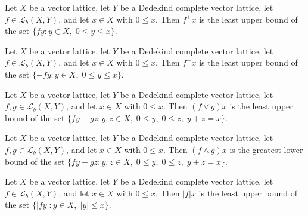 \begin{theorem}
\label{thm:isLUB-posPart-apply}
\leanok
{}
Let $X$ be a vector lattice, let $Y$ be a Dedekind complete vector
lattice, let $f \in \mathcal{L}_b(X, Y)$, and let $x \in X$ with
$0 \le x$. Then $f^{+} x$ is the least upper bound of the set
$\{ f y : y \in X, \; 0 \le y \le x \}$.
\end{theorem}

\begin{theorem}
\label{thm:isLUB-negPart-apply}
\leanok
{}
Let $X$ be a vector lattice, let $Y$ be a Dedekind complete vector
lattice, let $f \in \mathcal{L}_b(X, Y)$, and let $x \in X$ with
$0 \le x$. Then $f^{-} x$ is the least upper bound of the set
$\{ -f y : y \in X, \; 0 \le y \le x \}$.
\end{theorem}

\begin{theorem}
\label{thm:isLUB-sup-apply}
\leanok
{}
Let $X$ be a vector lattice, let $Y$ be a Dedekind complete vector
lattice, let $f, g \in \mathcal{L}_b(X, Y)$, and let $x \in X$ with
$0 \le x$. Then $(f \vee g) x$ is the least upper bound of the set
$\{ f y + g z : y, z \in X, \; 0 \le y, \; 0 \le z, \; y + z = x \}$.
\end{theorem}

\begin{theorem}
\label{thm:isGLB-inf-apply}
\leanok
{}
Let $X$ be a vector lattice, let $Y$ be a Dedekind complete vector
lattice, let $f, g \in \mathcal{L}_b(X, Y)$, and let $x \in X$ with
$0 \le x$. Then $(f \wedge g) x$ is the greatest lower bound of the
set $\{ f y + g z : y, z \in X, \; 0 \le y, \; 0 \le z, \; y + z =
x \}$.
\end{theorem}

\begin{theorem}
\label{thm:isLUB-abs-apply}
\leanok
{}
Let $X$ be a vector lattice, let $Y$ be a Dedekind complete vector
lattice, let $f \in \mathcal{L}_b(X, Y)$, and let $x \in X$ with
$0 \le x$. Then $\lvert f \rvert x$ is the least upper bound of the
set $\{ \lvert f y \rvert : y \in X, \; \lvert y \rvert \le x \}$.
\end{theorem}

